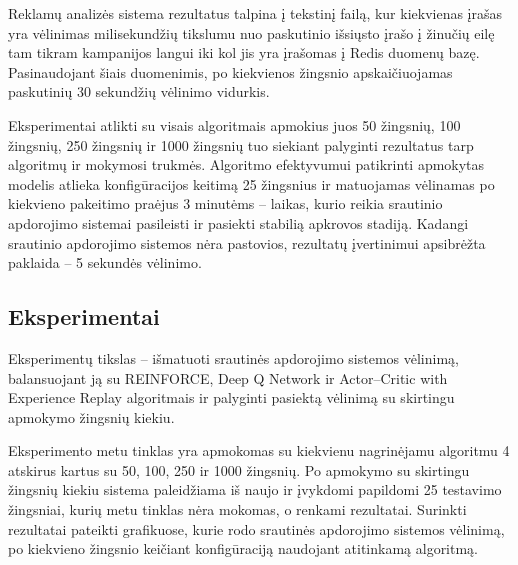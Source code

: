 \documentclass{VUMIFPSbakalaurinis}
\begin{document}
Reklamų analizės sistema rezultatus talpina į tekstinį failą, kur kiekvienas įrašas yra vėlinimas milisekundžių tikslumu nuo paskutinio išsiųsto įrašo į žinučių eilę tam tikram kampanijos langui iki kol jis yra įrašomas į Redis duomenų bazę. Pasinaudojant šiais duomenimis, po kiekvienos žingsnio apskaičiuojamas paskutinių 30 sekundžių vėlinimo vidurkis. 

Eksperimentai atlikti su visais algoritmais apmokius juos 50 žingsnių, 100 žingsnių, 250 žingsnių ir 1000 žingsnių tuo siekiant palyginti rezultatus tarp algoritmų ir mokymosi trukmės. Algoritmo efektyvumui patikrinti apmokytas modelis atlieka konfigūracijos keitimą 25 žingsnius ir matuojamas vėlinamas po kiekvieno pakeitimo praėjus 3 minutėms – laikas, kurio reikia srautinio apdorojimo sistemai pasileisti ir pasiekti stabilią apkrovos stadiją. Kadangi srautinio apdorojimo sistemos nėra pastovios, rezultatų įvertinimui apsibrėžta paklaida – 5 sekundės vėlinimo.

\subsection{Eksperimentai}
Eksperimentų tikslas – išmatuoti srautinės apdorojimo sistemos vėlinimą, balansuojant ją su REINFORCE, Deep Q Network ir Actor–Critic with Experience Replay algoritmais ir palyginti pasiektą vėlinimą su skirtingu apmokymo žingsnių kiekiu.

Eksperimento metu tinklas yra apmokomas su kiekvienu nagrinėjamu algoritmu 4 atskirus kartus su 50, 100, 250 ir 1000 žingsnių. Po apmokymo su skirtingu žingsnių kiekiu sistema paleidžiama iš naujo ir įvykdomi papildomi 25 testavimo žingsniai, kurių metu tinklas nėra mokomas, o renkami rezultatai. Surinkti rezultatai pateikti grafikuose, kurie rodo srautinės apdorojimo sistemos vėlinimą, po kiekvieno žingsnio keičiant konfigūraciją naudojant atitinkamą algoritmą.
\end{document}
